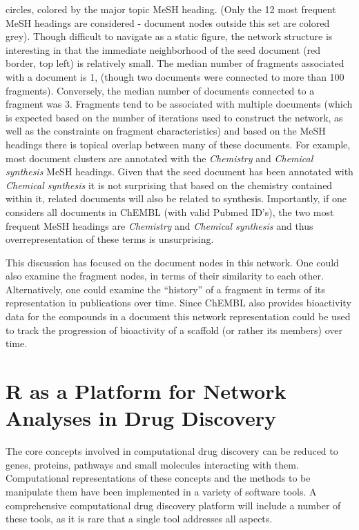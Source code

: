 \documentclass[]{book}
\begin{document}
circles, colored by the major topic MeSH heading. (Only the 12 most
frequent MeSH headings are considered - document nodes outside this
set are colored grey). Though difficult to navigate as a static  
figure, the network structure is interesting in that the immediate
neighborhood of the seed document (red border, top left) is relatively
small. The median number of fragments associated with a document is 1,
(though two documents were connected to more than 100
fragments). Conversely, the median number of documents connected to a
fragment was 3. Fragments tend to be associated with multiple
documents (which is expected based on the number of iterations used to
construct the network, as well as the constraints on fragment
characteristics) and based on the MeSH headings there is topical
overlap between many of these documents. For example, most document
clusters are annotated with the \emph{Chemistry} and \emph{Chemical
  synthesis} MeSH headings. Given that the seed document has been
annotated with \emph{Chemical synthesis} it is not surprising that
based on the chemistry contained within it, related documents will
also be related to synthesis. Importantly, if one considers all
documents in ChEMBL (with valid Pubmed ID's), the two most frequent
MeSH headings are \emph{Chemistry} and \emph{Chemical synthesis} and
thus overrepresentation of these terms is unsurprising. 

This discussion has focused on the document nodes in this network. One
could also examine the fragment nodes, in terms of their similarity to
each other. Alternatively, one could examine the ``history'' of a
fragment in terms of its representation in publications over
time. Since ChEMBL also provides bioactivity data for the compounds in
a document this network representation could be used to track the
progression of bioactivity of a scaffold (or rather its members) over
time.




\section{R as a Platform for Network Analyses in Drug Discovery}
\label{sec:r-as-platform}

The core concepts involved in computational drug discovery can be
reduced to genes, proteins, pathways and small molecules interacting
with them. Computational representations of these concepts and the
methods to be manipulate them have been implemented in a variety of
software tools. A comprehensive computational drug discovery platform
will include a number of these tools, as it is rare that a single tool
addresses all aspects.
\end{document}
